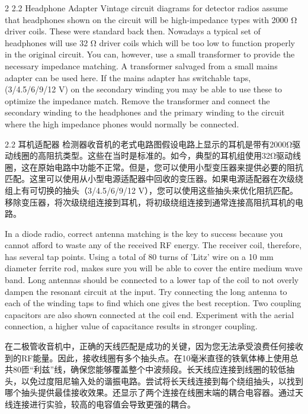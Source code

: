 \documentclass{ctexbook}
\begin{document}
\begin{paracol}{2}
2.2 Headphone Adapter 
Vintage circuit diagrams for detector radios assume that headphones shown on the circuit 
will be high-impedance types with 2000 Ω driver coils. These were standard back then. 
Nowadays a typical set of headphones will use 32 Ω driver coils which will be too low 
to function properly in the original circuit. You can, however, use a small transformer to 
provide the necessary impedance matching. A transformer salvaged from a small mains 
adapter can be used here. If the mains adapter has switchable taps, (3/4.5/6/9/12 V) on 
the secondary winding you may be able to use these to optimize the impedance match. 
Remove the transformer and connect the secondary winding to the headphones and the 
primary winding to the circuit where the high impedance phones would normally be connected. 

\switchcolumn

2.2 耳机适配器
检测器收音机的老式电路图假设电路上显示的耳机是带有2000Ω驱动线圈的高阻抗类型。这些在当时是标准的。如今，典型的耳机组使用32Ω驱动线圈，这在原始电路中功能不正常。但是，您可以使用小型变压器来提供必要的阻抗匹配。这里可以使用从小型电源适配器中回收的变压器。如果电源适配器在次级绕组上有可切换的抽头（3/4.5/6/9/12 V），您可以使用这些抽头来优化阻抗匹配。移除变压器，将次级绕组连接到耳机，将初级绕组连接到通常连接高阻抗耳机的电路。

\switchcolumn*

In a diode radio, correct antenna matching is the key to success because you cannot afford 
to waste any of the received RF energy. The receiver coil, therefore, has several tap points. 
Using a total of 80 turns of 'Litz' wire on a 10 mm diameter ferrite rod, makes sure you will 
be able to cover the entire medium wave band. Long antennas should be connected to a 
lower tap of the coil to not overly dampen the resonant circuit at the input. Try connecting 
the long antenna to each of the winding taps to find which one gives the best reception. 
Two coupling capacitors are also shown connected at the coil end. Experiment with the 
aerial connection, a higher value of capacitance results in stronger coupling. 

\switchcolumn

在二极管收音机中，正确的天线匹配是成功的关键，因为您无法承受浪费任何接收到的RF能量。因此，接收线圈有多个抽头点。在10毫米直径的铁氧体棒上使用总共80匝“利兹”线，确保您能够覆盖整个中波频段。长天线应连接到线圈的较低抽头，以免过度阻尼输入处的谐振电路。尝试将长天线连接到每个绕组抽头，以找到哪个抽头提供最佳接收效果。还显示了两个连接在线圈末端的耦合电容器。通过天线连接进行实验，较高的电容值会导致更强的耦合。


\end{paracol}
\end{document}
